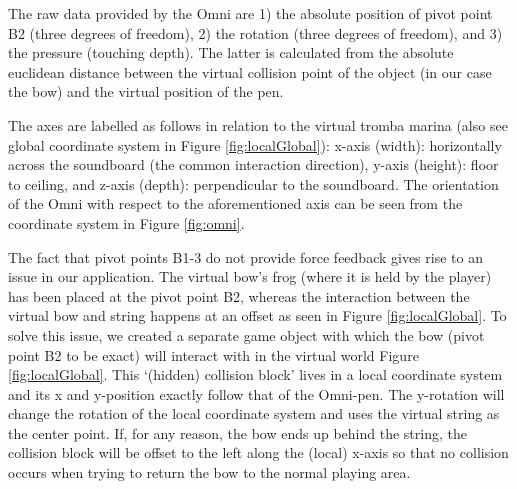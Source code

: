 The raw data provided by the Omni are 1) the absolute position of pivot point B2 (three degrees of freedom), 2) the rotation (three degrees of freedom), and 3) the pressure (touching depth). The latter is calculated from the absolute euclidean distance between the virtual collision point of the object (in our case the bow) and the virtual position of the pen.

The axes are labelled as follows in relation to the virtual tromba marina (also see global coordinate system in Figure \ref{fig:localGlobal}): x-axis (width): horizontally across the soundboard (the common interaction direction), y-axis (height): floor to ceiling, and z-axis (depth): perpendicular to the soundboard. The orientation of the Omni with respect to the aforementioned axis can be seen from the coordinate system in Figure \ref{fig:omni}.

The fact that pivot points B1-3 do not provide force feedback gives rise to an issue in our application. The virtual bow's frog (where it is held by the player) has been placed at the pivot point B2, whereas the interaction between the virtual bow and string happens at an offset as seen in Figure \ref{fig:localGlobal}. To solve this issue, we created a separate game object with which the bow (pivot point B2 to be exact) will interact with in the virtual world Figure \ref{fig:localGlobal}. This `(hidden) collision block' lives in a local coordinate system and its x and y-position exactly follow that of the Omni-pen. The y-rotation will change the rotation of the local coordinate system and uses the virtual string as the center point. If, for any reason, the bow ends up behind the string, the collision block will be offset to the left along the (local) x-axis so that no collision occurs when trying to return the bow to the normal playing area. 

